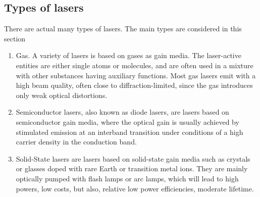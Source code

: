 \subsection{Types of lasers}\cite{lasertech}
	\label{blDOLSRtypes}
There are actual many types of \acs{laser}s. The main types are considered in this section
\begin{enumerate}
	\item Gas. A variety of \acs{laser}s is based on gases as gain media. The \acs{laser}-active entities are either single atoms or molecules, and are often used in a mixture with other substances having auxiliary functions. Most gas lasers emit with a high beam quality, often close to diffraction-limited, since the gas introduces only weak optical distortions.
	\item Semiconductor \acs{laser}s, also known as diode \acs{laser}s, are \acs{laser}s based on semiconductor gain media, where the optical gain is usually achieved by stimulated emission at an interband transition under conditions of a high carrier density in the conduction band.  
	\item Solid-State \acs{laser}s are \acs{laser}s based on solid-state gain media such as crystals or glasses doped with rare Earth or transition metal ions. They are mainly optically pumped with flash lamps or arc lamps, which will lead to high powers, low costs, but also, relative low power efficiencies, moderate lifetime.
\end{enumerate} 
